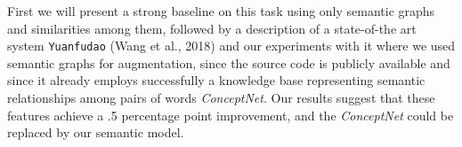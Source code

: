 First we will present a strong baseline on this task using only semantic graphs and similarities among them, followed by 
a description of a state-of-the art system \texttt{Yuanfudao} (Wang et al., 2018) and our experiments with it where
we used semantic graphs for augmentation, since the source code is publicly
available
and since it already employs successfully
a knowledge base representing semantic
relationships among pairs of words \textit{ConceptNet}.
Our results
suggest that these features achieve a .5
percentage point improvement, and the \textit{ConceptNet} could be replaced by our semantic model.
\vfill

